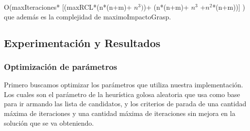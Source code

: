 O(maxIteraciones* [(maxRCL*(n*(n+m)+ $n^{3})$)+ (n*(n+m)+ $n^{3}$ +$ n^{2}$*(n+m))] )\\

 que además es la complejidad de maximoImpactoGrasp.\\


\subsection{Experimentación y Resultados}

\subsubsection{Optimización de parámetros}

\quad Primero buscamos optimizar los parámetros que utiliza nuestra implementación. Los cuales son el parámetro de la heurística golosa aleatoria que usa como base para ir armando las lista de candidatos, y los criterios de parada de una cantidad máxima de iteraciones y una cantidad máxima de iteraciones sin mejora en la solución que se va obteniendo.

